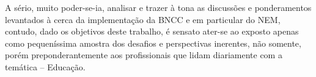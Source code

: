 A sério, muito poder-se-ia, analisar e trazer à tona as discussões e ponderamentos levantados à cerca da implementação da \ac{BNCC} e em particular do \ac{NEM}, contudo, dado os objetivos deste trabalho, é sensato ater-se ao exposto apenas como pequeníssima amostra dos desafios e perspectivas inerentes, não somente, porém preponderantemente aos profissionais que lidam diariamente com a temática -- Educação.
